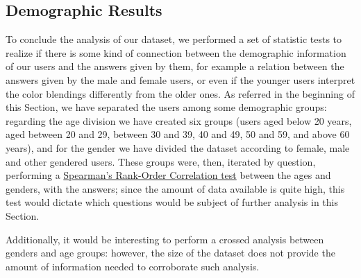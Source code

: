 \subsection{Demographic Results}
\label{subsec:results_demographic}
%
To conclude the analysis of our dataset, we performed a set of statistic tests to realize if there is some kind of connection between the demographic information of our users and the answers given by them, for example a relation between the answers given by
the male and female users, or even if the younger users interpret the color blendings differently from the older ones. As referred in the beginning of this Section, we have separated the users among some demographic groups: regarding the age division we have
created six groups (users aged below 20 years, aged between 20 and 29, between 30 and 39, 40 and 49, 50 and 59, and above 60 years), and for the gender we have divided the dataset according to female, male and other gendered users. These groups were, then, iterated
by question, performing a \ul{Spearman's Rank-Order Correlation test} between the ages and genders, with the answers; since the amount of data available is quite high, this test would dictate which questions would be subject of further analysis in this Section. \par
%
Additionally, it would be interesting to perform a crossed analysis between genders and age groups: however, the size of the dataset does not provide the amount of information needed to corroborate such analysis.
%
